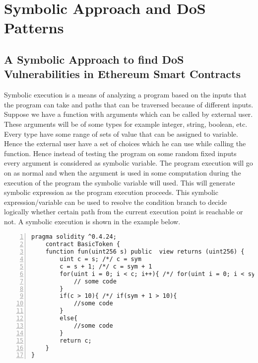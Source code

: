 \chapter{Symbolic Approach and DoS Patterns}
\label{ch:symA}
\section{A Symbolic Approach to find DoS Vulnerabilities in Ethereum Smart Contracts}
Symbolic execution\cite{symbolic} is a means of analyzing a program based on the inputs that the program can take and paths that can be traversed because of different inputs. Suppose we have a function with arguments which can be called by external user. These arguments will be of some types for example integer, string, boolean, etc. Every type have some range of sets of value that can be assigned to variable. Hence the external user have a set of choices which he can use while calling the function. Hence instead of testing the program on some random fixed inputs every argument is considered as symbolic variable. The program execution will go on as normal and when the argument is used in some computation during the execution of the program the symbolic variable will used. This will generate symbolic expression as the program execution proceeds. This symbolic expression/variable can be used to resolve the condition branch to decide logically whether certain path from the current execution point is reachable or not. A symbolic execution is shown in the example below.\\
\begin{Verbatim}[numbers=left,xleftmargin=5mm]
    pragma solidity ^0.4.24;
    contract BasicToken {
    function fun(uint256 s) public  view returns (uint256) {
        uint c = s; /*/ c = sym
        c = s + 1; /*/ c = sym + 1
        for(uint i = 0; i < c; i++){ /*/ for(uint i = 0; i < sym + 1; i++){
            // some code
        }
        if(c > 10){ /*/ if(sym + 1 > 10){
            //some code
        }
        else{
            //some code
        }
        return c;
    }
}
\end{Verbatim}
